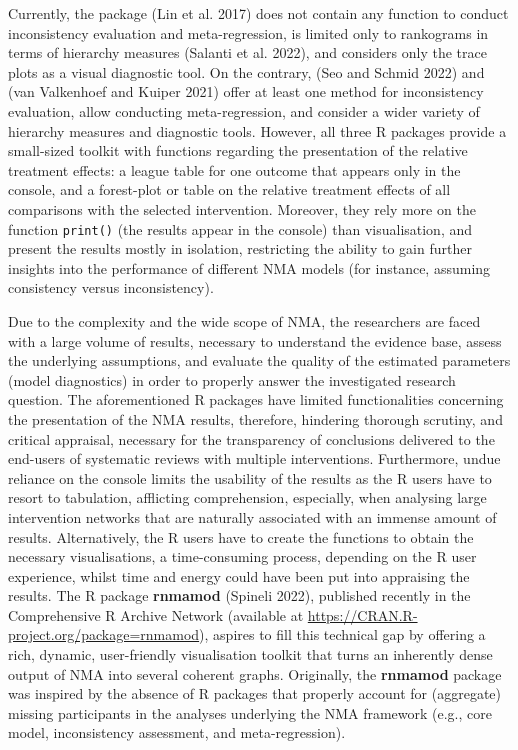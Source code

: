 Currently, the package  (Lin et al. 2017) does not contain any
function to conduct inconsistency evaluation and meta-regression, is limited only
to rankograms in terms of hierarchy measures (Salanti et al. 2022), and considers only
the trace plots as a visual diagnostic tool. On the contrary,  (Seo and Schmid 2022)
and  (van Valkenhoef and Kuiper 2021) offer at least one method for inconsistency evaluation,
allow conducting meta-regression, and consider a wider variety of hierarchy measures
and diagnostic tools. However, all three R packages provide a small-sized toolkit
with functions regarding the presentation of the relative treatment effects: a league
table for one outcome that appears only in the console, and a forest-plot or table
on the relative treatment effects of all comparisons with the selected intervention.
Moreover, they rely more on the function \texttt{print()} (the results appear in the
console) than visualisation, and present the results mostly in isolation, restricting
the ability to gain further insights into the performance of different NMA models
(for instance, assuming consistency versus inconsistency).

Due to the complexity and the wide scope of NMA, the researchers are faced with
a large volume of results, necessary to understand the evidence base, assess the
underlying assumptions, and evaluate the quality of the estimated parameters (model
diagnostics) in order to properly answer the investigated research question.
The aforementioned R packages have limited functionalities concerning
the presentation of the NMA results, therefore, hindering thorough scrutiny, and
critical appraisal, necessary for the transparency of conclusions delivered to the
end-users of systematic reviews with multiple interventions. Furthermore, undue
reliance on the console limits the usability of the results as the R users have
to resort to tabulation, afflicting comprehension, especially, when analysing
large intervention networks that are naturally associated with an immense amount
of results. Alternatively, the R users have to create the functions to obtain the
necessary visualisations, a time-consuming process, depending on the R user experience,
whilst time and energy could have been put into appraising the results. The R
package \textbf{rnmamod} (Spineli 2022), published recently in the Comprehensive R Archive
Network (available at
\url{https://CRAN.R-project.org/package=rnmamod}),
aspires to fill this technical gap by offering a rich, dynamic, user-friendly
visualisation toolkit that turns an inherently dense output of NMA into several
coherent graphs. Originally, the \textbf{rnmamod} package was inspired by the absence of
R packages that properly account for (aggregate) missing participants in the analyses
underlying the NMA framework (e.g., core model, inconsistency assessment, and
meta-regression).

